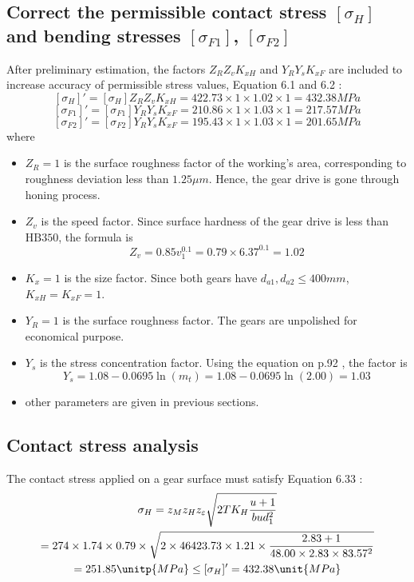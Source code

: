 \subsection{Correct the permissible contact stress $ [\sigma_H] $ and bending stresses $ [\sigma_{F1}] $, $ [\sigma_{F2}] $}
After preliminary estimation, the factors $ Z_RZ_vK_{xH} $ and $ Y_RY_sK_{xF} $ are included to increase accuracy of permissible stress values, Equation 6.1 and 6.2 \cite{tk1}:\\
\[[\sigma_H]'=[\sigma_H]Z_RZ_vK_{xH} = 422.73\times 1\times 1.02\times 1 = 432.38\unit{MPa}\]
\[[\sigma_{F1}]'=[\sigma_{F1}]Y_RY_sK_{xF} = 210.86\times 1\times 1.03\times 1 = 217.57\unit{MPa}\]
\[[\sigma_{F2}]'=[\sigma_{F2}]Y_RY_sK_{xF} = 195.43\times 1\times 1.03\times 1 = 201.65\unit{MPa}\]
where
\begin{itemize}
	\item $ Z_R = 1 $ is the surface roughness factor of the working's area, corresponding to roughness deviation  less than $ 1.25\unit{\mu m} $. Hence, the gear drive is gone through honing process.
	\item $ Z_v $ is the speed factor. Since surface hardness of the gear drive is less than $ \text{HB}350 $, the formula is
	\[ Z_v = 0.85v_1^{0.1} = 0.79\times 6.37^{0.1} = 1.02 \]
	\item $ K_x = 1$ is the size factor. Since both gears have $ d_{a1}, d_{a2} \leq 400\unit{mm} $, $ K_{xH}=K_{xF}=1 $.
	\item $ Y_R=1 $ is the surface roughness factor. The gears are unpolished for economical purpose.
	\item $ Y_s $ is the stress concentration factor. Using the equation on p.92 \cite{tk1}, the factor is
	\[Y_s = 1.08-0.0695\ln(m_t) = 1.08-0.0695\ln(2.00) = 1.03\]
	\item other parameters are given in previous sections.
\end{itemize}

\subsection{Contact stress analysis}

The contact stress applied on a gear surface must satisfy Equation 6.33 \cite{tk1}:
\begin{multline*}
\sigma_H = z_Mz_Hz_\varepsilon\sqrt{2TK_H\dfrac{u+1}{bud_1^2}} \\
= 274\times 1.74 \times 0.79 \times \sqrt{2\times 46423.73 \times 1.21 \times\dfrac{2.83+1}{48.00 \times 2.83 \times 83.57^2}}\\
= 251.85 \unitp{MPa} \leq [\sigma_H]' = 432.38 \unit{MPa}
\end{multline*}

